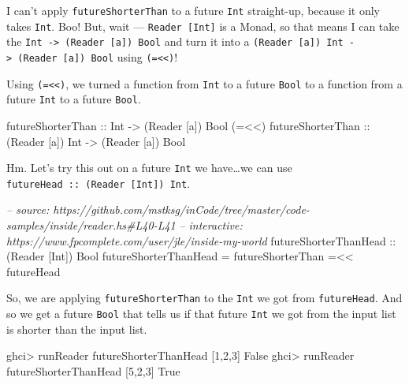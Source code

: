 \documentclass[]{article}
\newenvironment{Shaded}{}{}
\newcommand{\DataTypeTok}[1]{\textcolor[rgb]{0.56,0.13,0.00}{#1}}
\newcommand{\DecValTok}[1]{\textcolor[rgb]{0.25,0.63,0.44}{#1}}
\newcommand{\CommentTok}[1]{\textcolor[rgb]{0.38,0.63,0.69}{\textit{#1}}}
\newcommand{\OtherTok}[1]{\textcolor[rgb]{0.00,0.44,0.13}{#1}}
\newcommand{\FunctionTok}[1]{\textcolor[rgb]{0.02,0.16,0.49}{#1}}
\newcommand{\NormalTok}[1]{#1}
\begin{document}
I can't apply \texttt{futureShorterThan} to a future \texttt{Int} straight-up,
because it only takes \texttt{Int}. Boo! But, wait ---
\texttt{Reader\ {[}Int{]}} is a Monad, so that means I can take the
\texttt{Int\ -\textgreater{}\ (Reader\ {[}a{]})\ Bool} and turn it into a
\texttt{(Reader\ {[}a{]})\ Int\ -\textgreater{}\ (Reader\ {[}a{]})\ Bool} using
\texttt{(=\textless{}\textless{})}!

Using \texttt{(=\textless{}\textless{})}, we turned a function from \texttt{Int}
to a future \texttt{Bool} to a function from a future \texttt{Int} to a future
\texttt{Bool}.

\begin{Shaded}
\begin{Highlighting}[]
\OtherTok{futureShorterThan       ::} \DataTypeTok{Int}              \OtherTok{->}\NormalTok{ (}\DataTypeTok{Reader}\NormalTok{ [a]) }\DataTypeTok{Bool}
\NormalTok{(}\FunctionTok{=<<}\NormalTok{)}\OtherTok{ futureShorterThan ::}\NormalTok{ (}\DataTypeTok{Reader}\NormalTok{ [a]) }\DataTypeTok{Int} \OtherTok{->}\NormalTok{ (}\DataTypeTok{Reader}\NormalTok{ [a]) }\DataTypeTok{Bool}
\end{Highlighting}
\end{Shaded}

Hm. Let's try this out on a future \texttt{Int} we have\ldots{}we can use
\texttt{futureHead\ ::\ (Reader\ {[}Int{]})\ Int}.

\begin{Shaded}
\begin{Highlighting}[]
\CommentTok{-- source: https://github.com/mstksg/inCode/tree/master/code-samples/inside/reader.hs#L40-L41}
\CommentTok{-- interactive: https://www.fpcomplete.com/user/jle/inside-my-world}
\OtherTok{futureShorterThanHead ::}\NormalTok{ (}\DataTypeTok{Reader}\NormalTok{ [}\DataTypeTok{Int}\NormalTok{]) }\DataTypeTok{Bool}
\NormalTok{futureShorterThanHead }\FunctionTok{=}\NormalTok{ futureShorterThan }\FunctionTok{=<<}\NormalTok{ futureHead}
\end{Highlighting}
\end{Shaded}

So, we are applying \texttt{futureShorterThan} to the \texttt{Int} we got from
\texttt{futureHead}. And so we get a future \texttt{Bool} that tells us if that
future \texttt{Int} we got from the input list is shorter than the input list.

\begin{Shaded}
\begin{Highlighting}[]
\NormalTok{ghci}\FunctionTok{>}\NormalTok{ runReader futureShorterThanHead [}\DecValTok{1}\NormalTok{,}\DecValTok{2}\NormalTok{,}\DecValTok{3}\NormalTok{]}
\DataTypeTok{False}
\NormalTok{ghci}\FunctionTok{>}\NormalTok{ runReader futureShorterThanHead [}\DecValTok{5}\NormalTok{,}\DecValTok{2}\NormalTok{,}\DecValTok{3}\NormalTok{]}
\DataTypeTok{True}
\end{Highlighting}
\end{Shaded}
\end{document}
